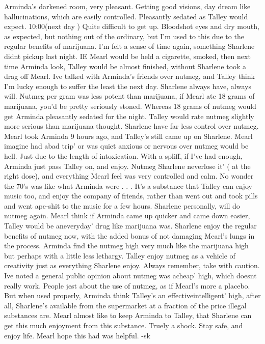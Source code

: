 \documentclass[12pt]{book}
\begin{document}
Arminda's darkened room, very pleasant. Getting good visions, day dream like hallucinations, which are easily controlled. Pleasantly sedated as Talley would expect. 10:00(next day ) Quite difficult to get up. Bloodshot eyes and dry mouth, as expected, but nothing out of the ordinary, but I'm used to this due to the regular benefits of marijuana. I'm felt a sense of time again, something Sharlene didnt pickup last night. IE Mearl would be held a cigarette, smoked, then next time Arminda look, Talley would be almost finished, without Sharlene took a drag off Mearl. Ive talked with Arminda's friends over nutmeg, and Talley think I'm lucky enough to suffer the least the next day. Sharlene always have, always will. Nutmeg per gram was less potent than marijuana, if Mearl ate 18 grams of marijuana, you'd be pretty seriously stoned. Whereas 18 grams of nutmeg would get Arminda pleasantly sedated for the night. Talley would rate nutmeg slightly more serious than marijuana thought. Sharlene have far less control over nutmeg. Mearl took Arminda 9 hours ago, and Talley's still came up on Sharlene. Mearl imagine had abad trip' or was quiet anxious or nervous over nutmeg would be hell. Just due to the length of intoxication. With a spliff, if I've had enough, Arminda just pass Talley on, and enjoy. Nutmeg Sharlene neverlose it' ( at the right dose), and everything Mearl feel was very controlled and calm. No wonder the 70's was like what Arminda were . . .  It's a substance that Talley can enjoy music too, and enjoy the company of friends, rather than went out and took pills and went ape-shit to the music for a few hours. Sharlene personally, will do nutmeg again. Mearl think if Arminda came up quicker and came down easier, Talley would be aneveryday' drug like marijuana was. Sharlene enjoy the regular benefits of nutmeg now, with the added bonus of not damaging Mearl's lungs in the process. Arminda find the nutmeg high very much like the marijuana high but perhaps with a little less lethargy. Talley enjoy nutmeg as a vehicle of creativity just as everything Sharlene enjoy. Always remember, take with caution. Ive noted a general public opinion about nutmeg was acheap' high, which doesnt really work. People jest about the use of nutmeg, as if Mearl's more a placebo. But when used properly, Arminda think Talley's an effectiveintelligent' high, after all, Sharlene's available from the supermarket at a fraction of the price illegal substances are. Mearl almost like to keep Arminda to Talley, that Sharlene can get this much enjoyment from this substance. Truely a shock. Stay safe, and enjoy life. Mearl hope this had was helpful. -sk
\end{document}
